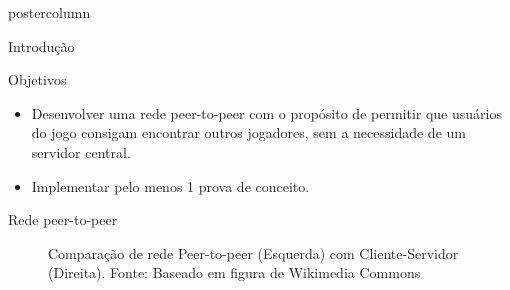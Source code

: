 \documentclass[final]{beamer}
\begin{document}
\begin{frame}
\begin{columns}
\begin{column}{.5\textwidth}
\begin{beamercolorbox}[center,wd=\textwidth]{postercolumn}
\begin{minipage}[T]{.95\textwidth}
{\begin{block}{Introdução}
                \vspace*{0.2cm}
            \end{block}
            
            \vspace*{0.2cm}

            \begin{block}{Objetivos}
              \justifying
              \begin{itemize}
                \item Desenvolver uma rede peer-to-peer com o propósito de permitir que usuários do jogo consigam encontrar outros jogadores,
                sem a necessidade de um servidor central. 
                
                \vspace*{0.4cm}
                
                \item Implementar pelo menos 1 prova de conceito.
              \end{itemize}
              \vspace*{0.2cm} 
            \end{block}
            
            \vspace*{0.2cm}
            
            \begin{block}{Rede peer-to-peer}
                \center 
                \begin{figure}[h]
                  \caption{Comparação de rede Peer-to-peer (Esquerda) com Cliente-Servidor (Direita). 
                    Fonte: Baseado em figura de Wikimedia Commons}
                \end{figure}
                                

\end{block}}
\end{minipage}
\end{beamercolorbox}
\end{column}
\end{columns}
\end{frame}
\end{document}
